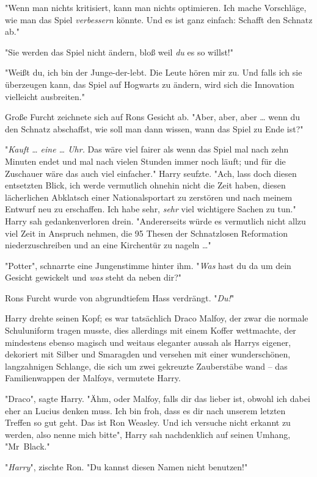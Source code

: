 {"Wenn man nichts kritisiert, kann man nichts optimieren. Ich mache Vorschläge, wie man das Spiel \emph{verbessern} könnte. Und es ist ganz einfach: Schafft den Schnatz ab."

"Sie werden das Spiel nicht ändern, bloß weil \emph{du} es so willst!"

"Weißt du, ich bin der Junge-der-lebt. Die Leute hören mir zu. Und falls ich sie überzeugen kann, das Spiel auf Hogwarts zu ändern, wird sich die Innovation vielleicht ausbreiten."

Große Furcht zeichnete sich auf Rons Gesicht ab. "Aber, aber, aber … wenn du den Schnatz abschaffst, wie soll man dann wissen, wann das Spiel zu Ende ist?"

"\emph{Kauft … eine … Uhr.} Das wäre viel fairer als wenn das Spiel mal nach zehn Minuten endet und mal nach vielen Stunden immer noch läuft; und für die Zuschauer wäre das auch viel einfacher." Harry seufzte. "Ach, lass doch diesen entsetzten Blick, ich werde vermutlich ohnehin nicht die Zeit haben, diesen lächerlichen Abklatsch einer Nationalsportart zu zerstören und nach meinem Entwurf neu zu erschaffen. Ich habe sehr, \emph{sehr} viel wichtigere Sachen zu tun." Harry sah gedankenverloren drein. "Andererseits würde es vermutlich nicht allzu viel Zeit in Anspruch nehmen, die 95 Thesen der Schnatzlosen Reformation niederzuschreiben und an eine Kirchentür zu nageln …"

"Potter", schnarrte eine Jungenstimme hinter ihm. "\emph{Was} hast du da um dein Gesicht gewickelt und \emph{was} steht da neben dir?"

Rons Furcht wurde von abgrundtiefem Hass verdrängt. "\emph{Du!}"

Harry drehte seinen Kopf; es war tatsächlich Draco Malfoy, der zwar die normale Schuluniform tragen musste, dies allerdings mit einem Koffer wettmachte, der mindestens ebenso magisch und weitaus eleganter aussah als Harrys eigener, dekoriert mit Silber und Smaragden und versehen mit einer wunderschönen, langzahnigen Schlange, die sich um zwei gekreuzte Zauberstäbe wand -- das Familienwappen der Malfoys, vermutete Harry.

"Draco", sagte Harry. "Ähm, oder Malfoy, falls dir das lieber ist, obwohl ich dabei eher an Lucius denken muss. Ich bin froh, dass es dir nach unserem letzten Treffen so gut geht. Das ist Ron Weasley. Und ich versuche nicht erkannt zu werden, also nenne mich bitte", Harry sah nachdenklich auf seinen Umhang, "Mr~Black."

"\emph{Harry}", zischte Ron. "Du kannst diesen Namen nicht benutzen!"

}

